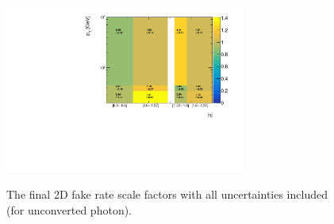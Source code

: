 \begin{figure}[!htbp]
\centering
{\includegraphics[width=0.7\textwidth]{figures/egammafakes/Map_EFake_SF_Final_unconverted.pdf}}
\caption [] {The final 2D fake rate scale factors with all uncertainties included (for unconverted photon).}
\label{fig:egammafake_ptetadiff_sfs_unconv}
\end{figure}   

